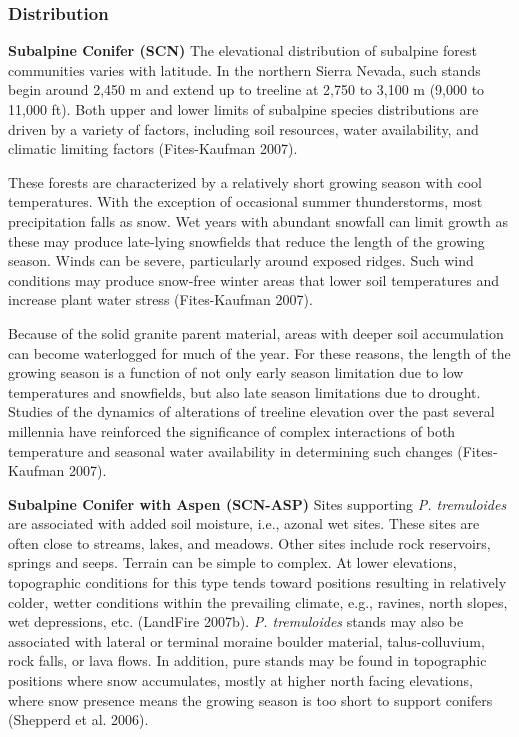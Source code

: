 \subsubsection{Distribution}
\textbf{Subalpine Conifer (SCN)} The elevational distribution of subalpine forest communities varies with latitude. In the northern Sierra Nevada, such stands begin around 2,450 m and extend up to treeline at 2,750 to 3,100 m (9,000 to 11,000 ft). Both upper and lower limits of subalpine species distributions are driven by a variety of factors, including soil resources, water availability, and climatic limiting factors (Fites-Kaufman 2007).

These forests are characterized by a relatively short growing season with cool temperatures. With the exception of occasional summer thunderstorms, most precipitation falls as snow. Wet years with abundant snowfall can limit growth as these may produce late-lying snowfields that reduce the length of the growing season. Winds can be severe, particularly around exposed ridges. Such wind conditions may produce snow-free winter areas that lower soil temperatures and increase plant water stress (Fites-Kaufman 2007).

Because of the solid granite parent material, areas with deeper soil accumulation can become waterlogged for much of the year. For these reasons, the length of the growing season is a function of not only early season limitation due to low temperatures and snowfields, but also late season limitations due to drought. Studies of the dynamics of alterations of treeline elevation over the past several millennia have reinforced the significance of complex interactions of both temperature and seasonal water availability in determining such changes (Fites-Kaufman 2007). 


\textbf{Subalpine Conifer with Aspen (SCN-ASP)} Sites supporting \emph{P. tremuloides} are associated with added soil moisture, i.e., azonal wet sites. These sites are often close to streams, lakes, and meadows. Other sites include rock reservoirs, springs and seeps. Terrain can be simple to complex. At lower elevations, topographic conditions for this type tends toward positions resulting in relatively colder, wetter conditions within the prevailing climate, e.g., ravines, north slopes, wet depressions, etc. (LandFire 2007b). \emph{P. tremuloides} stands may also be associated with lateral or terminal moraine boulder material, talus-colluvium, rock falls, or lava flows. In addition, pure stands may be found in topographic positions where snow accumulates, mostly at higher north facing elevations, where snow presence means the growing season is too short to support conifers (Shepperd et al. 2006).

